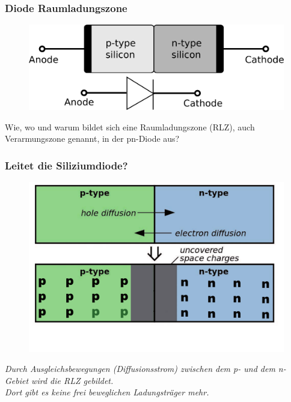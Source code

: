 \begin{frame}
  \frametitle{Diode Raumladungszone}
  \begin{center}
    \begin{figure}
      \includegraphics[width=1\textwidth,height=.6\textheight,keepaspectratio]{a05/diode_with_electrical_symbol.png}
    \end{figure}
    \large Wie, wo und warum bildet sich eine Raumladungszone (RLZ), auch Verarmungszone genannt, in der pn-Diode aus?
  \end{center}
\end{frame}

\begin{frame}
  \frametitle{Leitet die Siliziumdiode?}
  \begin{center}
    \begin{figure}
      \includegraphics[width=1\textwidth,height=.5\textheight,keepaspectratio]{a05/Pn_Junction_Diffusion_and_Drift.pdf}
    \end{figure}
    \emph{Durch Ausgleichsbewegungen (Diffusionsstrom) zwischen dem p- und dem n-Gebiet wird die RLZ gebildet.\\
    Dort gibt es keine frei beweglichen Ladungsträger mehr.}
  \end{center}
\end{frame}

